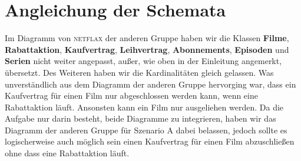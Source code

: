 \documentclass[11pt,a4paper,DIV=9]{scrartcl}
\begin{document}

\section{Angleichung der Schemata}
 Im Diagramm von \textsc{netflax} der anderen Gruppe haben wir die Klassen \textbf{Filme}, \textbf{Rabattaktion}, \textbf{Kaufvertrag}, \textbf{Leihvertrag}, \textbf{Abonnements}, \textbf{Episoden} und \textbf{Serien} nicht weiter angepasst, au{\ss}er, wie oben in der Einleitung angemerkt, \"ubersetzt. Des Weiteren haben wir die Kardinalit\"aten gleich gelassen. Was unverst\"andlich aus dem Diagramm der anderen Gruppe hervorging war, dass ein Kaufvertrag f\"ur einen Film nur abgeschlossen werden kann, wenn eine Rabattaktion l\"auft. Ansonsten kann ein Film nur ausgeliehen werden. Da die Aufgabe nur darin besteht, beide Diagramme zu integrieren, haben wir das Diagramm der anderen Gruppe f\"ur Szenario A dabei belassen, jedoch sollte es logischerweise auch m\"oglich sein einen Kaufvertrag f\"ur einen Film abzuschlie{\ss}en ohne dass eine Rabattaktion l\"auft.
\end{document}
